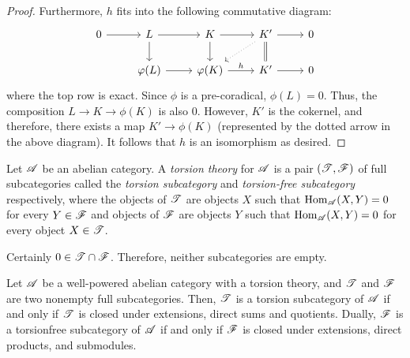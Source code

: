 \begin{proof}
Furthermore, $h$ fits into the following commutative diagram:
\[
\begin{tikzcd}
0 \arrow{r} &
L \arrow{r} \arrow{d} &
K \arrow{r} \arrow{d} &
K' \arrow{r} \arrow[equals]{d} \arrow[dotted]{ld} &
0 \\
& \phi(L) \arrow{r} &
\phi(K) \arrow{r}{h} &
K' \arrow{r} &
0
\end{tikzcd}
\]
where the top row is exact. Since $\phi$ is a pre-coradical, 
$\phi(L) = 0$. Thus, the composition $L \to K \to \phi(K)$ is also
$0$. However, $K'$ is the cokernel, and therefore, there exists a
map $K' \to \phi(K)$ (represented by the dotted arrow in the above 
diagram). It follows that $h$ is an isomorphism as desired.
\end{proof}

\begin{defn}
Let $\mathscr{A}$ be an abelian category. A \emph{torsion theory} for
$\mathscr{A}$ is a pair $(\mathscr{T}, \mathscr{F})$ of full subcategories 
called the \emph{torsion subcategory} and \emph{torsion-free 
subcategory} respectively, where the objects of $\mathscr{T}$ are
objects $X$ such that $\mathrm{Hom}_{\mathscr{A}}(X, Y) = 0$ for every $Y
\in \mathscr{F}$ and objects of $\mathscr{F}$ are objects $Y$ such that
$\mathrm{Hom}_{\mathscr{A}}(X, Y) = 0$ for every object $X \in \mathscr{T}$.
\end{defn}

Certainly $0 \in \mathscr{T} \cap \mathscr{F}$. Therefore, neither 
subcategories are empty.

\begin{prop}
Let $\mathscr{A}$ be a well-powered abelian category with a torsion 
theory, and $\mathscr{T}$ and $\mathscr{F}$ are two nonempty full 
subcategories. Then, $\mathscr{T}$ is a torsion subcategory of 
$\mathscr{A}$ if and only if $\mathscr{T}$ is closed under extensions, 
direct sums and quotients. Dually, $\mathscr{F}$ is a torsionfree 
subcategory of $\mathscr{A}$ if and only if $\mathscr{F}$ is closed under 
extensions, direct products, and submodules.
\end{prop}

